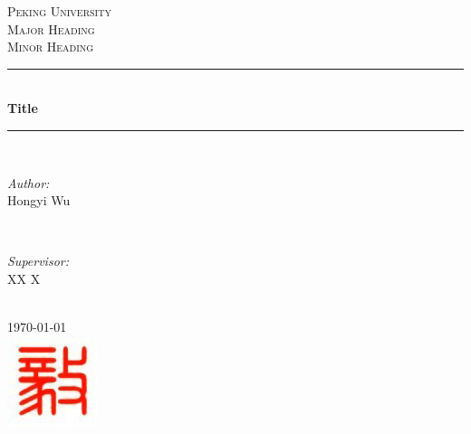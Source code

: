 \documentclass[12pt,a4paper]{article} %
\begin{document}

\begin{titlepage}

\newcommand{\HRule}{\rule{\linewidth}{0.5mm}} %

\center %

\textsc{\LARGE Peking University }\\[1.5cm] %
\textsc{\Large Major Heading}\\[0.5cm] %
\textsc{\large Minor Heading}\\[0.5cm] %

\HRule \\[0.4cm]
{ \huge \bfseries Title}\\[0.4cm] %
\HRule \\[1.5cm]

\begin{minipage}{0.4\textwidth}
\begin{flushleft} \large
\emph{Author:}\\
Hongyi Wu %
\end{flushleft}
\end{minipage}
~
\begin{minipage}{0.4\textwidth}
\begin{flushright} \large
\emph{Supervisor:} \\
XX X  %
\end{flushright}
\end{minipage}\\[4cm]

{\large \today}\\[3cm] %

\includegraphics{logo.jpeg}\\[1cm] %

\vfill %

\end{titlepage}
\end{document}
